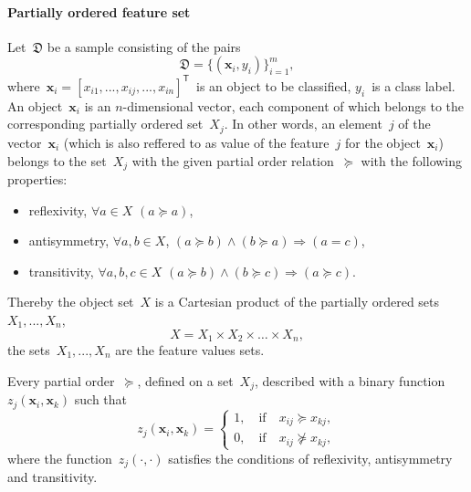 \documentclass[12pt,preprint]{elsarticle}
\newcommand{\bx}{\mathbf{x}}
\newcommand{\T}{^{\mathsf{T}}}
\begin{document}
\paragraph{Partially ordered feature set}
Let~$\mathfrak{D}$ be a sample consisting of the pairs
\[
\mathfrak{D}=\{(\bx_i,y_i)\}_{i=1}^m,
\label{eq:Sample}
\]
where~$\bx_i=[x_{i1},...,x_{ij},...,x_{in}]\T$~is an object to be classified, $y_i$~is a class label. An object~$\bx_i$ is an $n$-dimensional vector, each component of which belongs to the corresponding partially ordered set~$X_j$. In other words, an element~$j$ of the vector~$\bx_i$ (which is also reffered to as value of the feature~$j$ for the object~$\bx_i$) belongs to the set~$X_j$ with the given partial order relation~$\succeq$ with the following properties:
\begin{itemize}
\item reflexivity, $\forall a\in X$ $(a\succeq a)$,
\item antisymmetry, $\forall a,b\in X$, $(a\succeq b)\wedge(b\succeq a)\Rightarrow (a= c)$,
\item transitivity, $\forall a,b,c\in X$ $(a\succeq b)\wedge(b\succeq c)\Rightarrow (a\succeq c)$.
\end{itemize}
Thereby the object set~$X$ is a Cartesian product of the partially ordered sets~$X_1,...,X_n$,
\[
X=X_1\times X_2\times \dots \times X_n,
\]
the sets~$X_1,...,X_n$ are the feature values sets.

Every partial order~$\succeq$, defined on a set~$X_j$, described with a binary function~$z_j(\bx_i,\bx_k)$ such that
\[
z_j(\bx_i,\bx_k)=
\begin{cases}
1,\quad\text{if}\quad x_{ij} \succeq x_{kj}, \\
0,\quad\text{if}\quad x_{ij}\nsucceq x_{kj},
\end{cases}
\]
where the function~$z_j(\cdot,\cdot)$ satisfies the conditions of reflexivity, antisymmetry and transitivity.
\end{document}
